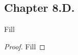 \subsection*{Chapter 8.D. }


\begin{exercise}{1}
  Fill
\end{exercise}
\begin{proof}
 Fill
\end{proof}